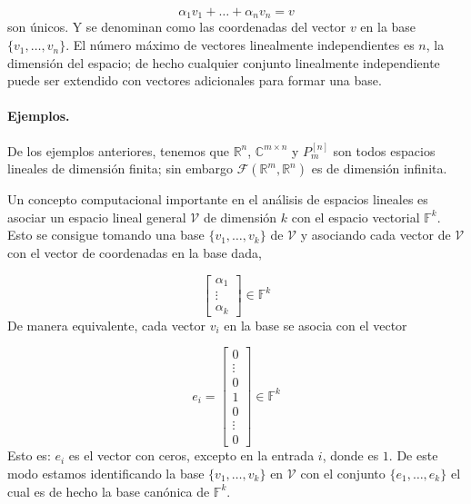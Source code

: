 \begin{equation*}
\alpha_1 v_1 + \dots + \alpha_n v_n = v
\end{equation*}
son únicos. Y se denominan como las coordenadas del vector $v$ en la base $\{ v_1, \dots, v_n \}$. El número máximo de vectores linealmente independientes es $n$, la dimensión del espacio; de hecho cualquier conjunto linealmente independiente puede ser extendido con vectores adicionales para formar una base.

\paragraph*{Ejemplos.} De los ejemplos anteriores, tenemos que $\mathbb{R}^n$, $\mathbb{C}^{m \times n}$ y $P_{m}^{[n]}$ son todos espacios lineales de dimensión finita; sin embargo $\mathcal{F}(\mathbb{R}^m,\mathbb{R}^n)$ es de dimensión infinita. 

Un concepto computacional importante en el análisis de espacios lineales es asociar un espacio lineal general $\mathcal{V}$ de dimensión $k$ con el espacio vectorial $\mathbb{F}^{k}$. Esto se consigue tomando una base $\{ v_1,\dots, v_k \}$ de $\mathcal{V}$ y asociando cada vector de $\mathcal{V}$ con el vector de coordenadas en la base dada,

\begin{equation*}
\left[\begin{array}{c}
    \alpha_1 \\
    \vdots \\
    \alpha_k 
\end{array}  \right] \in \mathbb{F}^k
\end{equation*}
De manera equivalente, cada vector $v_i$ en la base se asocia con el vector

\begin{equation*}
e_i = \left[\begin{array}{c}
    0 \\
    \vdots \\
    0 \\
    1 \\
    0 \\
    \vdots \\
    0
\end{array}  \right] \in \mathbb{F}^k
\end{equation*}
Esto es: $e_i$ es el vector con ceros, excepto en la entrada $i$, donde es $1$. De este modo estamos identificando la base  $\{ v_1,\dots, v_k \}$ en $\mathcal{V}$ con el conjunto   $\{ e_1,\dots, e_k \}$ el cual es de hecho la base canónica de $\mathbb{F}^k$.

